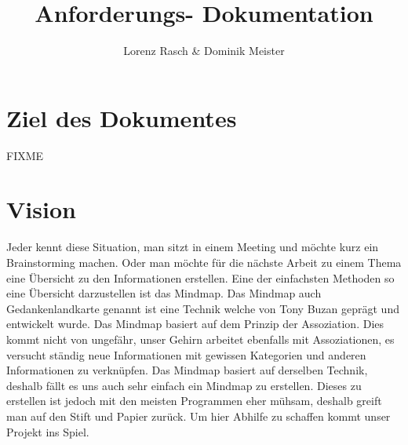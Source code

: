 \documentclass[a4paper,parskip]{scrartcl}
\title{Anforderungs- Dokumentation}
\author{Lorenz Rasch \& Dominik Meister}
\begin{document}
\maketitle
\tableofcontents
\pagebreak

\section{Ziel des Dokumentes}
FIXME

\section{Vision}
Jeder kennt diese Situation, man sitzt in einem Meeting und möchte kurz ein Brainstorming machen. Oder man
möchte für die nächste Arbeit zu einem Thema eine Übersicht zu den Informationen erstellen.
Eine der einfachsten Methoden so eine Übersicht darzustellen ist das Mindmap. Das Mindmap auch Gedankenlandkarte genannt ist eine Technik welche von Tony Buzan geprägt und entwickelt wurde.
Das Mindmap basiert auf dem Prinzip der Assoziation. Dies kommt nicht von ungefähr, unser Gehirn arbeitet ebenfalls mit Assoziationen, es versucht ständig neue Informationen mit gewissen Kategorien und anderen Informationen zu verknüpfen. Das Mindmap basiert auf derselben Technik, deshalb fällt es uns auch sehr einfach ein Mindmap zu erstellen.
Dieses zu erstellen ist jedoch mit den meisten Programmen eher mühsam, deshalb greift man auf den Stift und Papier zurück. Um hier Abhilfe zu schaffen kommt unser Projekt ins Spiel.
\newpage
\end{document}
